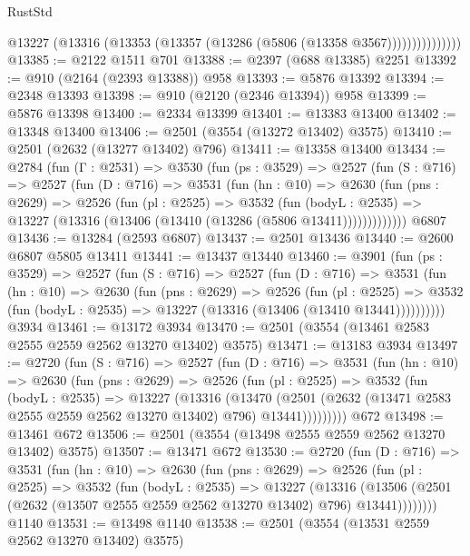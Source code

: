 \begin{lexlean}{RustStd}
\begin{coremodule}
{\begin{coremodule}
{{{{{{{{{{{{{{{{{{{{                    @13227 (@13316 (@13353 (@13357 (@13286 (@5806 (@13358 @3567)))))))))))))))
@13385 := @2122 @1511 @701
@13388 := @2397 (@688 @13385) @2251
@13392 := @910 (@2164 (@2393 @13388)) @958
@13393 := @5876 @13392
@13394 := @2348 @13393
@13398 := @910 (@2120 (@2346 @13394)) @958
@13399 := @5876 @13398
@13400 := @2334 @13399
@13401 := @13383 @13400
@13402 := @13348 @13400
@13406 := @2501 (@3554 (@13272 @13402) @3575)
@13410 := @2501 (@2632 (@13277 @13402) @796)
@13411 := @13358 @13400
@13434 := @2784
    (fun (Γ : @2531) =>
    @3530
      (fun (ps : @3529) =>
      @2527
        (fun (S : @716) =>
        @2527
          (fun (D : @716) =>
          @3531
            (fun (hn : @10) =>
            @2630
              (fun (pns : @2629) =>
              @2526
                (fun (pl : @2525) =>
                @3532
                  (fun (bodyL : @2535) =>
                  @13227 (@13316 (@13406 (@13410 (@13286 (@5806 @13411)))))))))))))
    @6807
@13436 := @13284 (@2593 @6807)
@13437 := @2501 @13436
@13440 := @2600 @6807 @5805 @13411
@13441 := @13437 @13440
@13460 := @3901
    (fun (ps : @3529) =>
    @2527
      (fun (S : @716) =>
      @2527
        (fun (D : @716) =>
        @3531
          (fun (hn : @10) =>
          @2630
            (fun (pns : @2629) =>
            @2526
              (fun (pl : @2525) =>
              @3532 (fun (bodyL : @2535) => @13227 (@13316 (@13406 (@13410 @13441))))))))))
    @3934
@13461 := @13172 @3934
@13470 := @2501 (@3554 (@13461 @2583 @2555 @2559 @2562 @13270 @13402) @3575)
@13471 := @13183 @3934
@13497 := @2720
    (fun (S : @716) =>
    @2527
      (fun (D : @716) =>
      @3531
        (fun (hn : @10) =>
        @2630
          (fun (pns : @2629) =>
          @2526
            (fun (pl : @2525) =>
            @3532
              (fun (bodyL : @2535) =>
              @13227
                (@13316
                  (@13470
                    (@2501
                      (@2632 (@13471 @2583 @2555 @2559 @2562 @13270 @13402) @796)
                      @13441)))))))))
    @672
@13498 := @13461 @672
@13506 := @2501 (@3554 (@13498 @2555 @2559 @2562 @13270 @13402) @3575)
@13507 := @13471 @672
@13530 := @2720
    (fun (D : @716) =>
    @3531
      (fun (hn : @10) =>
      @2630
        (fun (pns : @2629) =>
        @2526
          (fun (pl : @2525) =>
          @3532
            (fun (bodyL : @2535) =>
            @13227
              (@13316
                (@13506 (@2501 (@2632 (@13507 @2555 @2559 @2562 @13270 @13402) @796) @13441))))))))
    @1140
@13531 := @13498 @1140
@13538 := @2501 (@3554 (@13531 @2559 @2562 @13270 @13402) @3575)
}}}}}}}}}}}}}}}}}}}}
\end{coremodule}}
\end{coremodule}
\end{lexlean}
